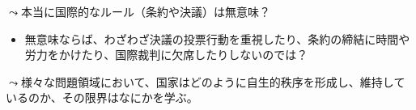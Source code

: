 \documentclass[
  xelatex,
  ja=standard]{bxjsarticle}
\providecommand{\tightlist}{%
  \setlength{\itemsep}{0pt}\setlength{\parskip}{0pt}}\usepackage{longtable,booktabs,array}
\begin{document}
\(\leadsto\)本当に国際的なルール（条約や決議）は無意味？

\begin{itemize}
\tightlist
\item
  無意味ならば、わざわざ決議の投票行動を重視したり、条約の締結に時間や労力をかけたり、国際裁判に欠席したりしないのでは？
\end{itemize}

\(\leadsto\)様々な問題領域において、国家はどのように自生的秩序を形成し、維持しているのか、その限界はなにかを学ぶ。


  
\end{document}
